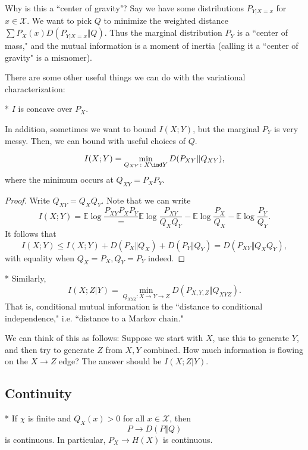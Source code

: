 Why is this a ``center of gravity"? 
Say we have some distributions $P_{Y|X=x}$ for $x\in \mathcal X$. We want to pick $Q$ to minimize the weighted distance $\sum P_X(x) D(P_{Y|X=x} \Vert Q)$. 
Thus the marginal distribution $P_Y$ is a ``center of mass," and the mutual information is a moment of inertia (calling it a ``center of gravity" is a misnomer).

There are some other useful things we can do with the variational characterization:

\begin{cor}*
	$I$ is concave over $P_X$.
\end{cor}

In addition, sometimes we want to bound $I(X;Y)$, but the marginal $P_Y$ is very messy. Then, we can bound with useful choices of $Q$.

\begin{fact}
	\[
		I(X;Y) = \min_{Q_{XY} \colon X\ind Y} D(P_{XY}\Vert Q_{XY}),
	\]where the minimum occurs at $Q_{XY} = P_XP_Y$.
\end{fact}

\begin{proof}
	Write $Q_{XY} = Q_XQ_Y$. Note that we can write \[
		I(X;Y) = \mathbb E \log \frac{P_{XY}{P_XP_Y}} = \mathbb E\log \frac{P_{XY}}{Q_XQ_Y} - \mathbb E\log \frac{P_X}{Q_X} - \mathbb E\log \frac{P_Y}{Q_Y}.
	\]It follows that \[
		I(X;Y) \leq I(X;Y) + D(P_X\Vert Q_X) + D(P_Y\Vert Q_Y) = D(P_{XY} \Vert Q_XQ_Y),
	\]with equality when $Q_X = P_X, Q_Y = P_Y$ indeed.
\end{proof}

\begin{fact}*
	Similarly, \[
		I(X;Z|Y) = \min_{Q_{XYZ}\colon X\to Y\to Z} D(P_{X,Y,Z} \Vert Q_{XYZ}).
	\]
	That is, conditional mutual information is the ``distance to conditional independence," i.e. ``distance to a Markov chain."
\end{fact}

We can think of this as follows: Suppose we start with $X$, use this to generate $Y$, and then try to generate $Z$ from $X,Y$ combined. How much information is flowing on the $X\to Z$ edge? The answer should be $I(X;Z|Y)$.

\subsection{Continuity}

\begin{fact}*
	If $\chi$ is finite and $Q_X(x) > 0$ for all $x\in \mathcal X$, then \[
		P\to D(P\Vert Q)
	\]is continuous. In particular, $P_X\to H(X)$ is continuous.
\end{fact}

